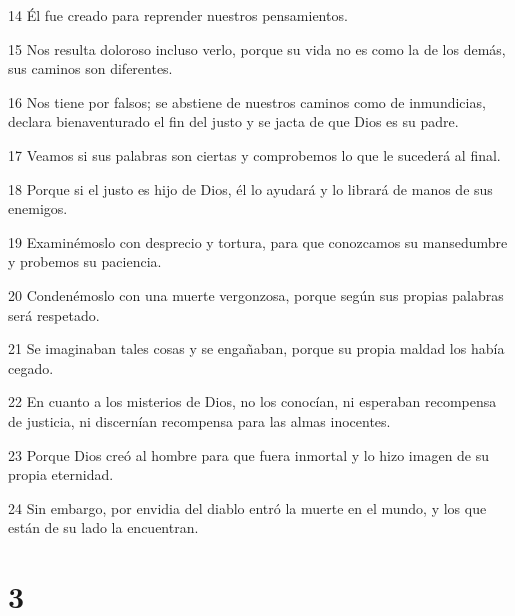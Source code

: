\par 14 Él fue creado para reprender nuestros pensamientos.
\par 15 Nos resulta doloroso incluso verlo, porque su vida no es como la de los demás, sus caminos son diferentes.
\par 16 Nos tiene por falsos; se abstiene de nuestros caminos como de inmundicias, declara bienaventurado el fin del justo y se jacta de que Dios es su padre.
\par 17 Veamos si sus palabras son ciertas y comprobemos lo que le sucederá al final.
\par 18 Porque si el justo es hijo de Dios, él lo ayudará y lo librará de manos de sus enemigos.
\par 19 Examinémoslo con desprecio y tortura, para que conozcamos su mansedumbre y probemos su paciencia.
\par 20 Condenémoslo con una muerte vergonzosa, porque según sus propias palabras será respetado.
\par 21 Se imaginaban tales cosas y se engañaban, porque su propia maldad los había cegado.
\par 22 En cuanto a los misterios de Dios, no los conocían, ni esperaban recompensa de justicia, ni discernían recompensa para las almas inocentes.
\par 23 Porque Dios creó al hombre para que fuera inmortal y lo hizo imagen de su propia eternidad.
\par 24 Sin embargo, por envidia del diablo entró la muerte en el mundo, y los que están de su lado la encuentran.

\chapter{3}


